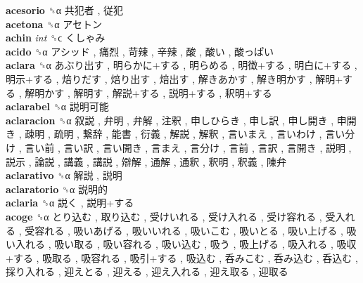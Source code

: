 \textbf{acesorio} ␝α   共犯者 ,  従犯   \\
\textbf{acetona} ␝α   アセトン   \\
\textbf{achin} \emph{int}  ␝ϲ   くしゃみ   \\
\textbf{acido} ␝α   アシッド ,  痛烈 ,  苛辣 ,  辛辣 ,  酸 ,  酸い ,  酸っぱい   \\
\textbf{aclara} ␝α   あぶり出す ,  明らかに+する ,  明らめる ,  明徴+する ,  明白に+する ,  明示+する ,  焙りだす ,  焙り出す ,  焙出す ,  解きあかす ,  解き明かす ,  解明+する ,  解明かす ,  解明す ,  解説+する ,  説明+する ,  釈明+する   \\
\textbf{aclarabel} ␝α   説明可能   \\
\textbf{aclaracion} ␝α   叙説 ,  弁明 ,  弁解 ,  注釈 ,  申しひらき ,  申し訳 ,  申し開き ,  申開き ,  疎明 ,  疏明 ,  繋辞 ,  能書 ,  衍義 ,  解説 ,  解釈 ,  言いまえ ,  言いわけ ,  言い分け ,  言い前 ,  言い訳 ,  言い開き ,  言まえ ,  言分け ,  言前 ,  言訳 ,  言開き ,  説明 ,  説示 ,  論説 ,  講義 ,  講説 ,  辯解 ,  通解 ,  通釈 ,  釈明 ,  釈義 ,  陳弁   \\
\textbf{aclarativo} ␝α   解説 ,  説明   \\
\textbf{aclaratorio} ␝α   説明的   \\
\textbf{aclaria} ␝α   説く ,  説明+する   \\
\textbf{acoge} ␝α   とり込む ,  取り込む ,  受けいれる ,  受け入れる ,  受け容れる ,  受入れる ,  受容れる ,  吸いあげる ,  吸いいれる ,  吸いこむ ,  吸いとる ,  吸い上げる ,  吸い入れる ,  吸い取る ,  吸い容れる ,  吸い込む ,  吸う ,  吸上げる ,  吸入れる ,  吸収+する ,  吸取る ,  吸容れる ,  吸引+する ,  吸込む ,  呑みこむ ,  呑み込む ,  呑込む ,  採り入れる ,  迎えとる ,  迎える ,  迎え入れる ,  迎え取る ,  迎取る   \\
